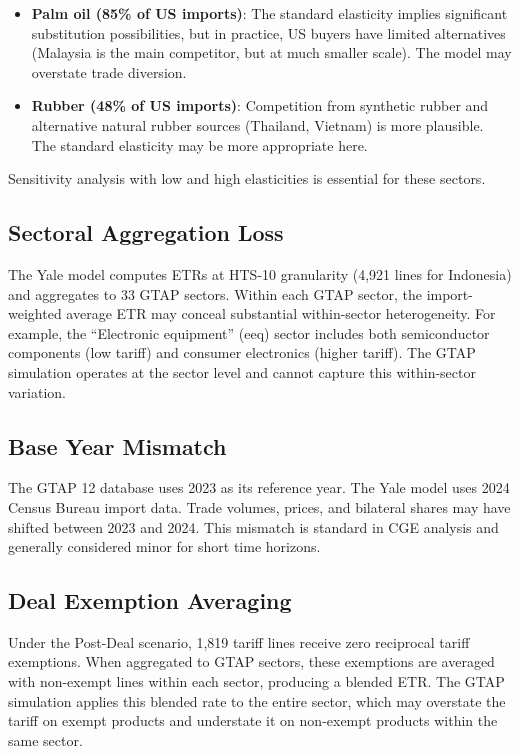 \documentclass[12pt,a4paper]{article}
\begin{document}
\begin{itemize}
    \item \textbf{Palm oil (85\% of US imports)}: The standard elasticity implies significant substitution possibilities, but in practice, US buyers have limited alternatives (Malaysia is the main competitor, but at much smaller scale). The model may overstate trade diversion.
    \item \textbf{Rubber (48\% of US imports)}: Competition from synthetic rubber and alternative natural rubber sources (Thailand, Vietnam) is more plausible. The standard elasticity may be more appropriate here.
\end{itemize}

\noindent Sensitivity analysis with low and high elasticities is essential for these sectors.

\subsection{Sectoral Aggregation Loss}

The Yale model computes ETRs at HTS-10 granularity (4,921 lines for Indonesia) and aggregates to 33 GTAP sectors. Within each GTAP sector, the import-weighted average ETR may conceal substantial within-sector heterogeneity. For example, the ``Electronic equipment'' (eeq) sector includes both semiconductor components (low tariff) and consumer electronics (higher tariff). The GTAP simulation operates at the sector level and cannot capture this within-sector variation.

\subsection{Base Year Mismatch}

The GTAP 12 database uses 2023 as its reference year. The Yale model uses 2024 Census Bureau import data. Trade volumes, prices, and bilateral shares may have shifted between 2023 and 2024. This mismatch is standard in CGE analysis and generally considered minor for short time horizons.

\subsection{Deal Exemption Averaging}

Under the Post-Deal scenario, 1,819 tariff lines receive zero reciprocal tariff exemptions. When aggregated to GTAP sectors, these exemptions are averaged with non-exempt lines within each sector, producing a blended ETR. The GTAP simulation applies this blended rate to the entire sector, which may overstate the tariff on exempt products and understate it on non-exempt products within the same sector.
\end{document}
